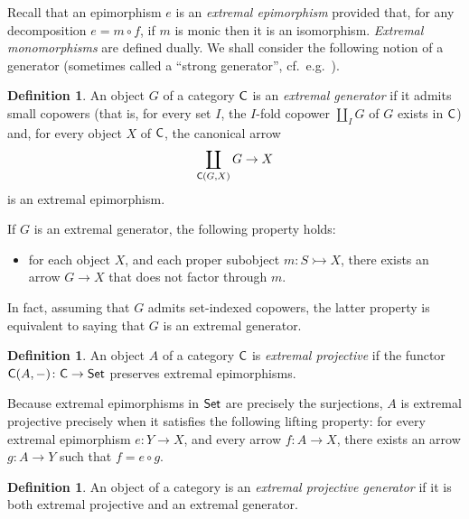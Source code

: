 \documentclass[a4paper,10pt,reqno]{amsart}
\theoremstyle{definition}
\newtheorem{definition}[theorem]{Definition}
\theoremstyle{remark}
\newcommand{\cat}{{\sf C}}								%
\newcommand{\Set}{{\sf Set}}							%
\newcommand{\emb}{\rightarrowtail}							%
\begin{document}
Recall that an epimorphism $e$ is an \emph{extremal epimorphism} provided that, for any decomposition $e= m\circ f$, if $m$ is monic then it is an isomorphism. \emph{Extremal monomorphisms} are defined dually. We shall consider the following notion of a generator (sometimes called a ``strong generator'', cf.\ e.g.\ \cite{ar94book}).

\begin{definition}
An object $G$ of a category $\cat$ is an \emph{extremal generator} if it admits small copowers (that is, for every set $I$, the $I$-fold copower $\coprod_I{G}$ of $G$ exists in $\cat$) and, for every object $X$ of $\cat$, the canonical arrow
\[
\coprod_{\cat(G,X)}{G} \to X
\]
is an extremal epimorphism.
\end{definition}

If $G$ is an extremal generator, the following property holds:
\begin{itemize}
\item for each object $X$, and each proper subobject $m\colon S\emb X$, there exists an arrow $G\to X$ that does not factor through $m$.
\end{itemize}
%
In fact, assuming that $G$ admits set-indexed copowers, the latter property is equivalent to saying that $G$ is an extremal generator. 

\begin{definition}
An object $A$ of a category $\cat$ is \emph{extremal projective} if the functor $\cat(A,-)\colon \cat \to \Set$ preserves extremal epimorphisms. 
\end{definition}

Because extremal epimorphisms in $\Set$ are precisely the surjections, $A$ is extremal projective precisely when it satisfies the following lifting property: for every extremal epimorphism $e\colon Y\to X$, and every arrow $f\colon A\to X$, there exists an arrow $g\colon A\to Y$ such that $f = e\circ g$.

\begin{definition}\label{def:extremal-projective-generator}
An object of a category is an \emph{extremal projective generator} if it is both extremal projective and an extremal generator.
\end{definition}
\end{document}
